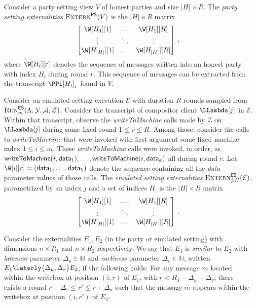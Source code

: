 \begin{definition}
  Consider a party setting view $V$ of honest parties and size $|H| \times R$.
  The \emph{party setting externalities} $\textsc{Extern}^{\textsf{PS}}(V)$ is the $|H| \times R$ matrix
  \[
  \begin{bmatrix}
    \W[H_1][1] &\ldots& \W[H_1][R]\\
         \vdots &\ddots& \vdots     \\
    \W[H_{|H|}][1] &\ldots& \W[H_{|H|}][R]
  \end{bmatrix}\,,
  \]
  where $\W[H_i][r]$ denotes the sequence of messages written into an honest party
  with index $H_i$ during round $r$. This sequence of messages can be extracted from
  the transcript $\PPi[H_i]_r$ found in $V$.
\end{definition}

\begin{definition}
  Consider an emulated setting execution $\mathcal{E}$ with duration $R$ rounds
  sampled from $\textsc{Run}^{\textsf{ES}}_m(\Lambda,\allowbreak \mathcal{Y},\allowbreak \mathcal{A},\allowbreak \mathcal{Z})$.
  Consider the transcript of compositor client $\LLambda[j]$ in $\mathcal{E}$.
  Within that transcript, observe the \emph{writeToMachine} calls made by
  $\mathcal{Z}$ on $\LLambda[j]$ during some fixed round $1 \leq r \leq R$.
  Among those, consider the calls to \emph{writeToMachine} that were
  invoked with first argument some fixed machine index $1 \leq i \leq m$.
  These \emph{writeToMachine} calls were invoked, in order, as
  $\textsf{writeToMachine}(i, \textsf{data}_1),\allowbreak \ldots, \textsf{writeToMachine}(i, \textsf{data}_k)$
  all during round $r$.
  Let $\W[i][r] = (\data_1,\allowbreak\ldots,\allowbreak\data_k)$ denote the sequence containing
  all the \emph{data} parameter values of those calls.
  The \emph{emulated setting externalities} $\textsc{Extern}^{\textsf{ES}}_{j,H}(\mathcal{E})$, parametrized
  by an index $j$ and a set of indices $H$, is the $|H| \times R$ matrix
  \[
  \begin{bmatrix}
    \W[H_1][1] &\ldots& \W[H_1][R]\\
         \vdots &\ddots& \vdots     \\
    \W[H_{|H|}][1] &\ldots& \W[H_{|H|}][R]
  \end{bmatrix}\,.
  \]
\end{definition}

\begin{definition}
  Consider the externalities $E_1, E_2$ (in the party or emulated setting)
  with dimensions $n \times R_1$ and $n \times R_2$ respectively.
  We say that $E_1$ is \emph{similar} to $E_2$ with \emph{lateness} parameter
  $\Delta_u \in \mathbb{N}$ and \emph{earliness} parameter $\Delta_v \in \mathbb{N}$, written
  $E_1 \laterly{\Delta_u,\Delta_v} E_2$, if
  the following holds:
  For any message $m$ located within the writebox at position $(i, r)$ of $E_1$,
  with $r < R_1 - \Delta_u - \Delta_v$,
  there exists a round $r - \Delta_v \leq r' \leq r + \Delta_u$ such that
  the message $m$ appears within the writebox at position $(i, r')$ of $E_2$.
\end{definition}

